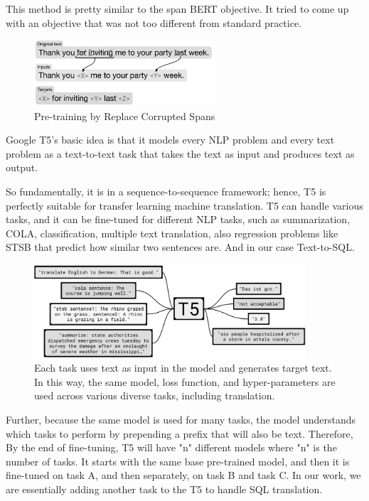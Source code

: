This method is pretty similar to the span BERT objective. It tried to come up with an objective that was not too different from standard practice.

\begin{figure}[H]
    \centering
    \includegraphics[width=0.6\textwidth]{pics/picard/t5-fine.png}
    \caption{Pre-training by Replace Corrupted Spans \cite{raffel_exploring_2020}}
\end{figure}

Google T5's basic idea is that it models every NLP problem and every text problem as a text-to-text task that takes the text as input and produces text as output.

So fundamentally, it is in a sequence-to-sequence framework; hence, T5 is perfectly suitable for transfer learning machine translation.
T5 can handle various tasks, and it can be fine-tuned for different NLP tasks, such as summarization, \ac{COLA}, classification, multiple text translation, also regression problems like STSB  that predict how similar two sentences are. And in our case Text-to-SQL.

\begin{figure}[H]
    \centering
    \includegraphics[width=0.9\textwidth]{pics/picard/t5-task.png}
    \caption{Each task uses text as input in the model and generates target text. In this way, the same model, loss function, and hyper-parameters are used across various diverse tasks, including translation. \cite{raffel_exploring_2020}}
\end{figure}

Further, because the same model is used for many tasks, the model understands which tasks to perform by prepending a prefix that will also be text.
Therefore, By the end of fine-tuning, T5 will have "n" different models where "n" is the number of tasks. It starts with the same base pre-trained model, and then it is fine-tuned on task A, and then separately, on task B and task C. In our work, we are essentially adding another task to the T5 to handle SQL translation.

